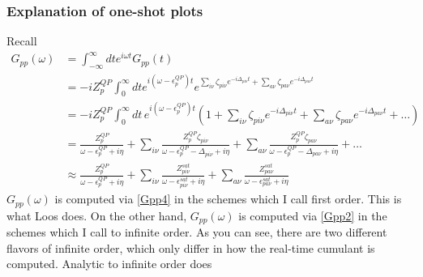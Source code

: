 \subsubsection{Explanation of one-shot plots}
Recall
\begin{align}
G_{pp}(\omega) & = \int_{-\infty}^{\infty} dt e^{i \omega t} G_{pp}(t)
\label{Gpp1}
\\
& = -i Z_p^{QP} \int_0^{\infty} dt e^{i(\omega - \epsilon_p^{QP}) t} e^{\sum_{i\nu} \zeta_{pi\nu} e^{-i\Delta_{pi\nu} t} + \sum_{a\nu} \zeta_{pa\nu} e^{-i\Delta_{pa\nu} t}} 
\label{Gpp2}
\\
& = -i Z_p^{QP} \int_0^{\infty} dt\, e^{i(\omega - \epsilon_p^{QP}) t} \left(1 + \sum_{i\nu} \zeta_{pi\nu} e^{-i\Delta_{pi\nu} t} + \sum_{a\nu} \zeta_{pa\nu} e^{-i\Delta_{pa\nu} t} +\ldots \right) \\
&= \frac{Z_p^{QP}}{\omega - \epsilon_p^{QP} + i\eta} + \sum_{i\nu} \frac{Z_p^{QP} \zeta_{pi\nu}}{\omega - \epsilon_p^{QP} - \Delta_{pi\nu} + i\eta} + \sum_{a\nu} \frac{Z_p^{QP} \zeta_{pa\nu}}{\omega - \epsilon_p^{QP} - \Delta_{pa\nu} + i\eta} + \ldots\\
& \approx \frac{Z_p^{QP}}{\omega - \epsilon_p^{QP} + i\eta} + \sum_{i\nu} \frac{Z_{pi\nu}^{sat}}{\omega - \epsilon_{pi\nu}^{sat} + i\eta} + \sum_{a\nu} \frac{Z_{pa\nu}^{sat}}{\omega - \epsilon_{pa\nu}^{sat} + i\eta}
\label{Gpp4}
\end{align}
 $G_{pp}(\omega)$ is computed via \ref{Gpp4} in the schemes which I call first order. This is what Loos does. On the other hand, $G_{pp}(\omega)$ is computed via \ref{Gpp2} in the schemes which I call to infinite order. As you can see, there are two different flavors of infinite order, which only differ in how the real-time cumulant is computed. Analytic to infinite order does
